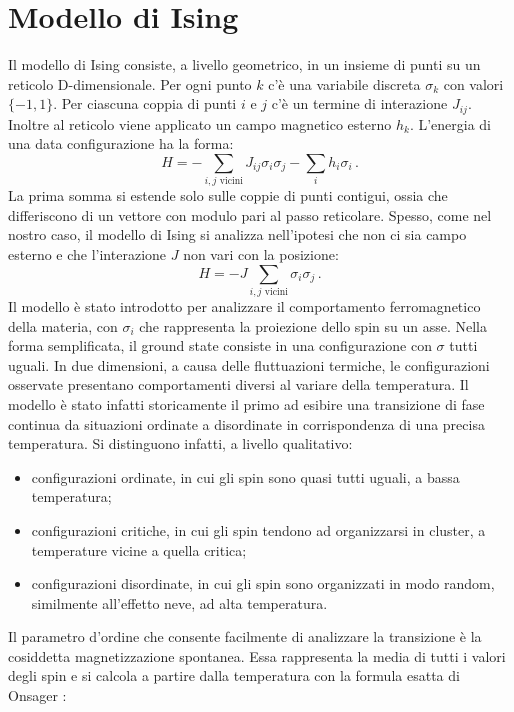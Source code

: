 \documentclass[Lau, noexaminfo, oneside]{sapthesis} %
\begin{document}
\chapter{Modello di Ising}
Il modello di Ising consiste, a livello geometrico, in un insieme di punti su un reticolo D-dimensionale. Per ogni punto $k$ c'è una variabile discreta $\sigma_k$ con valori $\lbrace-1, 1\rbrace$. Per ciascuna coppia di punti $i$ e $j$ c'è un termine di interazione $J_{ij}$. Inoltre al reticolo viene applicato un campo magnetico esterno $h_{k}$. L'energia di una data configurazione ha la forma:
\begin{equation}
H = - \sum_{i,j \text{ vicini}} J_{ij} \sigma_i \sigma_j - \sum_i h_i \sigma_i \,.
\label{isingcompleto}
\end{equation}
La prima somma si estende solo sulle coppie di punti contigui, ossia che differiscono di un vettore con modulo pari al passo reticolare. Spesso, come nel nostro caso, il modello di Ising si analizza nell'ipotesi che non ci sia campo esterno e che l'interazione $J$ non vari con la posizione:
\begin{equation}
H = -J \sum_{i,j \text{ vicini}}  \sigma_i \sigma_j \,.
\end{equation}
Il modello è stato introdotto per analizzare il comportamento ferromagnetico della materia, con $\sigma_{i}$ che rappresenta la proiezione dello spin su un asse. Nella forma semplificata, il ground state consiste in una configurazione con $\sigma$ tutti uguali. In due dimensioni, a causa delle fluttuazioni termiche, le configurazioni osservate presentano comportamenti diversi al variare della temperatura. Il modello è stato infatti storicamente il primo ad esibire una transizione di fase continua da situazioni ordinate a disordinate in corrispondenza di una precisa temperatura.
Si distinguono infatti, a livello qualitativo:
\begin{itemize}
\item configurazioni ordinate, in cui gli spin sono quasi tutti uguali, a bassa temperatura;
\item configurazioni critiche, in cui gli spin tendono ad organizzarsi in cluster, a temperature vicine a quella critica;
\item configurazioni disordinate, in cui gli spin sono organizzati in modo random, similmente all'effetto neve, ad alta temperatura.
\end{itemize}
Il parametro d'ordine che consente facilmente di analizzare la transizione è la cosiddetta magnetizzazione spontanea. Essa rappresenta la media di tutti i valori degli spin e si calcola a partire dalla temperatura con la formula esatta di Onsager \cite{onsager}:
\end{document}
